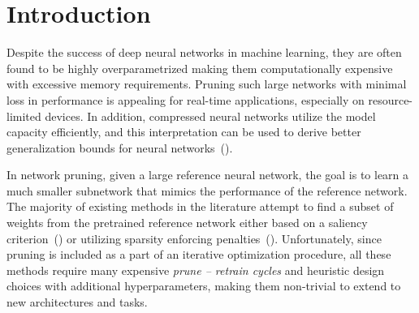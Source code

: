 \section{Introduction}
Despite the success of deep neural networks in machine learning, they are often found to be highly overparametrized making them computationally expensive with excessive memory requirements.
Pruning such large networks with minimal loss in performance is appealing for real-time applications, especially on resource-limited devices.
In addition, compressed neural networks utilize the model capacity efficiently, and this interpretation can be used to derive better generalization bounds for neural networks~(\cite{arora2018stronger}).

In network pruning, given a large reference neural network, the goal is to learn a much smaller subnetwork that mimics the performance of the reference network.
The majority of existing methods in the literature attempt to find a subset of weights from the pretrained reference network either based on a saliency criterion~(\cite{NIPS1988_119,lecun1990optimal,han2015learning}) or utilizing sparsity enforcing penalties~(\cite{chauvin1989back,Carreira-Perpiñán_2018_CVPR}).
Unfortunately, since pruning is included as a part of an iterative optimization procedure, all these methods require many expensive {\em prune -- retrain cycles} and heuristic design choices with additional hyperparameters, making them non-trivial to extend to new architectures and tasks.
 


